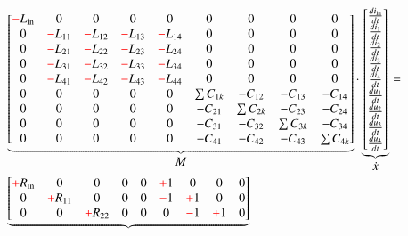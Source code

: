 \begin{refsection}
{\footnotesize 
\begin{align}
			&
			\underbrace{\begin{bmatrix}
			\color{red}-\color{black}L_\mathrm{in}&0&0&0&0 & 0&0&0&0 \\
			0&\color{red}-\color{black}L_{11}&\color{red}-\color{black}L_{12}&\color{red}-\color{black}L_{13}&\color{red}-\color{black}L_{14} & 0&0&0&0 \\
			0&\color{red}-\color{black}L_{21}&\color{red}-\color{black}L_{22}&\color{red}-\color{black}L_{23}&\color{red}-\color{black}L_{24} & 0&0&0&0 \\
			0&\color{red}-\color{black}L_{31}&\color{red}-\color{black}L_{32}&\color{red}-\color{black}L_{33}&\color{red}-\color{black}L_{34} & 0&0&0&0 \\
			0&\color{red}-\color{black}L_{41}&\color{red}-\color{black}L_{42}&\color{red}-\color{black}L_{43}&\color{red}-\color{black}L_{44} & 0&0&0&0 \\
			0&0&0&0&0 & \sum{C_{1k}}&-C_{12}&-C_{13}&-C_{14} \\
			0&0&0&0&0 & -C_{21}&\sum{C_{2k}}&-C_{23}&-C_{24} \\
			0&0&0&0&0 & -C_{31}&-C_{32}&\sum{C_{3k}}&-C_{34} \\
			0&0&0&0&0 & -C_{41}&-C_{42}&-C_{43}&\sum{C_{4k}}
			    \end{bmatrix}}_{\displaystyle  M}
			\cdot
			\underbrace{\begin{bmatrix}
			\frac{di_\mathrm{in}}{dt} \\
			\frac{di_1}{dt} \\
			\frac{di_2}{dt} \\
			\frac{di_3}{dt} \\
			\frac{di_4}{dt} \\
			\frac{du_1}{dt} \\
			\frac{du_2}{dt} \\
			\frac{du_3}{dt} \\
			\frac{du_4}{dt}
			\end{bmatrix}}_{\displaystyle \dot{x}}
			= \nonumber \\
			&
			\underbrace{\begin{bmatrix}
			\color{red}+\color{black}R_\mathrm{in}&0&0&0&0 & \color{red}+\color{black}1&0&0&0 \\
			0&\color{red}+\color{black}R_{11}&0&0&0 & \color{red}-\color{black}1&\color{red}+\color{black}1&0&0 \\
			0&0&\color{red}+\color{black}R_{22}&0&0 & 0&\color{red}-\color{black}1&\color{red}+\color{black}1&0 \\

\end{bmatrix}}
\end{align}}
\end{refsection}
